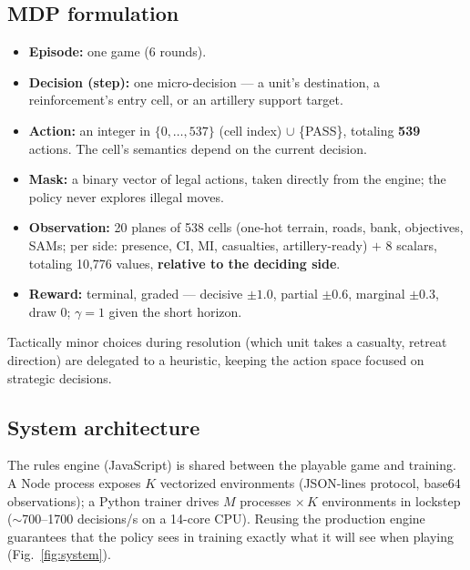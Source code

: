 \documentclass{article}
\begin{document}
\subsection{MDP formulation}
\begin{itemize}[leftmargin=1.4em,itemsep=2pt]
  \item \textbf{Episode:} one game (6 rounds).
  \item \textbf{Decision (step):} one micro-decision --- a unit's destination, a
  reinforcement's entry cell, or an artillery support target.
  \item \textbf{Action:} an integer in $\{0,\dots,537\}$ (cell index) $\cup$ \{PASS\},
  totaling \textbf{539} actions. The cell's semantics depend on the current decision.
  \item \textbf{Mask:} a binary vector of legal actions, taken directly from the engine;
  the policy never explores illegal moves.
  \item \textbf{Observation:} 20 planes of 538 cells (one-hot terrain, roads, bank,
  objectives, SAMs; per side: presence, CI, MI, casualties, artillery-ready) $+$ 8
  scalars, totaling 10{,}776 values, \textbf{relative to the deciding side}.
  \item \textbf{Reward:} terminal, graded --- decisive $\pm1.0$, partial $\pm0.6$,
  marginal $\pm0.3$, draw 0; $\gamma=1$ given the short horizon.
\end{itemize}
Tactically minor choices during resolution (which unit takes a casualty, retreat
direction) are delegated to a heuristic, keeping the action space focused on strategic
decisions.

\subsection{System architecture}
The rules engine (JavaScript) is shared between the playable game and training. A Node
process exposes $K$ vectorized environments (JSON-lines protocol, base64 observations); a
Python trainer drives $M$ processes $\times\,K$ environments in lockstep ($\sim$700--1700
decisions/s on a 14-core CPU). Reusing the production engine guarantees that the policy
sees in training exactly what it will see when playing (Fig.~\ref{fig:system}).
\end{document}
